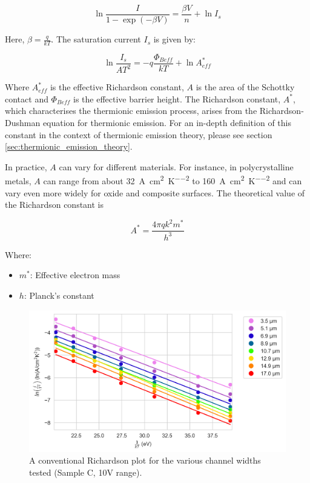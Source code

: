 \begin{equation}
    \ln{\frac{I}{1-\exp{\left(-\beta V\right)}}} = \frac{\beta V}{n} + \ln{I_{s}}
    \label{eq:thermionic_emission_graphical}
\end{equation}

Here, \(\beta=\frac{q}{kT}\). The saturation current $I_{s}$ is given by:

\begin{equation}
    \ln{\frac{I_{s}}{AT^{2}}} = -q\frac{\Phi_{Beff}}{kT} + \ln{A^{*}_{eff}}
\end{equation}

Where $A^{*}_{eff}$ is the effective Richardson constant, $A$ is the area of the Schottky contact and $\Phi_{Beff}$ is the effective barrier height. The Richardson constant, \( A^{*} \), which characterises the thermionic emission process, arises from the Richardson-Dushman equation for thermionic emission. For an in-depth definition of this constant in the context of thermionic emission theory, please see section \ref{sec:thermionic_emission_theory}.

In practice, \( A \) can vary for different materials. For instance, in polycrystalline metals, \( A \) can range from about \SI{32}{\ampere\per\centi\meter\squared\per\kelvin\squared} to \SI{160}{\ampere\per\centi\meter\squared\per\kelvin\squared} and can vary even more widely for oxide and composite surfaces. The theoretical value of the Richardson constant is

\begin{equation}
    A^{*} = \frac{4\pi qk^{2}m^{*}}{h^{3}}
\end{equation}

Where:
\begin{itemize}
    \item \(m^{*}\): Effective electron mass
    \item \(h\): Planck's constant
\end{itemize}

\begin{figure}[h]
    \centering
    \includegraphics[width=\textwidth]{Sample C 2019/Richardson_Plot.png}
    \caption{A conventional Richardson plot for the various channel widths tested (Sample C, 10V range).}
    \label{fig:richardsonC}
\end{figure}

